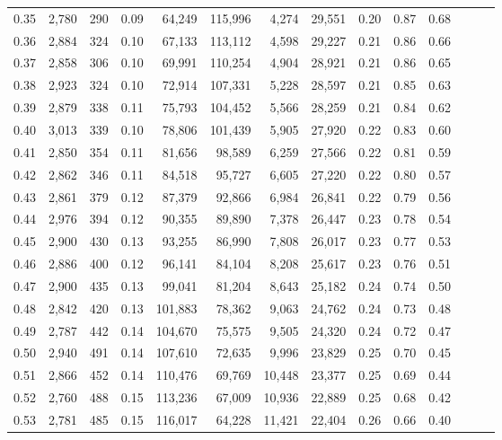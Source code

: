 \begin{tabular}{rrrrrrrrrrrrrr}
0.35 &  2,780 &  290 &  0.09 &   64,249 &  115,996 &   4,274 &  29,551 &  0.20 &  0.87 &      0.68 \\
0.36 &  2,884 &  324 &  0.10 &   67,133 &  113,112 &   4,598 &  29,227 &  0.21 &  0.86 &      0.66 \\
0.37 &  2,858 &  306 &  0.10 &   69,991 &  110,254 &   4,904 &  28,921 &  0.21 &  0.86 &      0.65 \\
0.38 &  2,923 &  324 &  0.10 &   72,914 &  107,331 &   5,228 &  28,597 &  0.21 &  0.85 &      0.63 \\
0.39 &  2,879 &  338 &  0.11 &   75,793 &  104,452 &   5,566 &  28,259 &  0.21 &  0.84 &      0.62 \\
0.40 &  3,013 &  339 &  0.10 &   78,806 &  101,439 &   5,905 &  27,920 &  0.22 &  0.83 &      0.60 \\
0.41 &  2,850 &  354 &  0.11 &   81,656 &   98,589 &   6,259 &  27,566 &  0.22 &  0.81 &      0.59 \\
0.42 &  2,862 &  346 &  0.11 &   84,518 &   95,727 &   6,605 &  27,220 &  0.22 &  0.80 &      0.57 \\
0.43 &  2,861 &  379 &  0.12 &   87,379 &   92,866 &   6,984 &  26,841 &  0.22 &  0.79 &      0.56 \\
0.44 &  2,976 &  394 &  0.12 &   90,355 &   89,890 &   7,378 &  26,447 &  0.23 &  0.78 &      0.54 \\
0.45 &  2,900 &  430 &  0.13 &   93,255 &   86,990 &   7,808 &  26,017 &  0.23 &  0.77 &      0.53 \\
0.46 &  2,886 &  400 &  0.12 &   96,141 &   84,104 &   8,208 &  25,617 &  0.23 &  0.76 &      0.51 \\
0.47 &  2,900 &  435 &  0.13 &   99,041 &   81,204 &   8,643 &  25,182 &  0.24 &  0.74 &      0.50 \\
0.48 &  2,842 &  420 &  0.13 &  101,883 &   78,362 &   9,063 &  24,762 &  0.24 &  0.73 &      0.48 \\
0.49 &  2,787 &  442 &  0.14 &  104,670 &   75,575 &   9,505 &  24,320 &  0.24 &  0.72 &      0.47 \\
0.50 &  2,940 &  491 &  0.14 &  107,610 &   72,635 &   9,996 &  23,829 &  0.25 &  0.70 &      0.45 \\
0.51 &  2,866 &  452 &  0.14 &  110,476 &   69,769 &  10,448 &  23,377 &  0.25 &  0.69 &      0.44 \\
0.52 &  2,760 &  488 &  0.15 &  113,236 &   67,009 &  10,936 &  22,889 &  0.25 &  0.68 &      0.42 \\
0.53 &  2,781 &  485 &  0.15 &  116,017 &   64,228 &  11,421 &  22,404 &  0.26 &  0.66 &      0.40 \\

\end{tabular}
